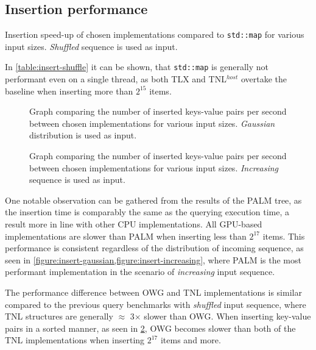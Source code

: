 \subsection{Insertion performance}

\begin{table}
  \centering
  
  \caption{Insertion speed-up of chosen implementations compared to \texttt{std::map} for various input sizes. \textit{Shuffled} sequence is used as input.}
  \label{table:insert-shuffle}
\end{table}

In \cref{table:insert-shuffle} it can be shown, that \texttt{std::map} is generally not performant even on a single thread, as both TLX and TNL$^{host}$ overtake the baseline when inserting more than $2^{15}$ items.


\begin{figure}
  
  \caption{Graph comparing the number of inserted keys-value pairs per second between chosen implementations for various input sizes. \textit{Gaussian} distribution is used as input.}
  \label{figure:insert-gaussian}
\end{figure}

\begin{figure}
  
  \caption{Graph comparing the number of inserted keys-value pairs per second between chosen implementations for various input sizes. \textit{Increasing} sequence is used as input.}
  \label{figure:insert-increasing}
\end{figure}

\clearpage

One notable observation can be gathered from the results of the PALM tree, as the insertion time is comparably the same as the querying execution time, a result more in line with other CPU implementations. All GPU-based implementations are slower than PALM when inserting less than $2^{17}$ items. This performance is consistent regardless of the distribution of incoming sequence, as seen in \cref{figure:insert-gaussian,figure:insert-increasing}, where PALM is the most performant implementation in the scenario of \textit{increasing} input sequence.

The performance difference between OWG and TNL implementations is similar compared to the previous query benchmarks with \textit{shuffled} input sequence, where TNL structures are generally $\approx$ 3$\times$ slower than OWG. When inserting key-value pairs in a sorted manner, as seen in \cref{figure:insert-increasing}, OWG becomes slower than both of the TNL implementations when inserting $2^{{17}}$ items and more.
